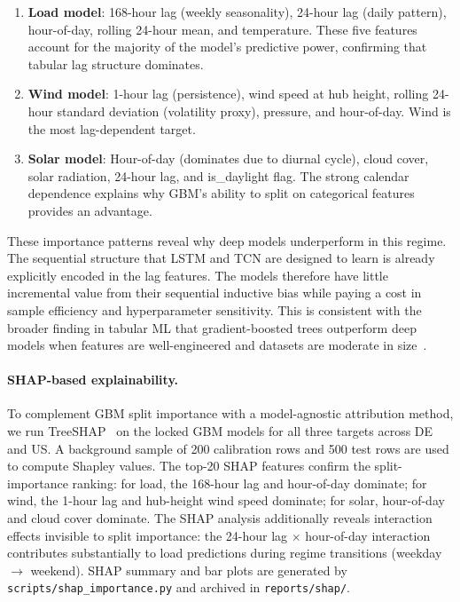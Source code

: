 \documentclass[11pt,a4paper]{article}
\begin{document}
\begin{enumerate}[leftmargin=*,topsep=2pt,itemsep=1pt]
  \item \textbf{Load model}: 168-hour lag (weekly seasonality), 24-hour lag (daily pattern), hour-of-day, rolling 24-hour mean, and temperature. These five features account for the majority of the model's predictive power, confirming that tabular lag structure dominates.
  \item \textbf{Wind model}: 1-hour lag (persistence), wind speed at hub height, rolling 24-hour standard deviation (volatility proxy), pressure, and hour-of-day. Wind is the most lag-dependent target.
  \item \textbf{Solar model}: Hour-of-day (dominates due to diurnal cycle), cloud cover, solar radiation, 24-hour lag, and is\_daylight flag. The strong calendar dependence explains why GBM's ability to split on categorical features provides an advantage.
\end{enumerate}

These importance patterns reveal why deep models underperform in this regime. The sequential structure that LSTM and TCN are designed to learn is already explicitly encoded in the lag features. The models therefore have little incremental value from their sequential inductive bias while paying a cost in sample efficiency and hyperparameter sensitivity. This is consistent with the broader finding in tabular ML that gradient-boosted trees outperform deep models when features are well-engineered and datasets are moderate in size~\cite{borisov2022deep}.

\paragraph{SHAP-based explainability.}
To complement GBM split importance with a model-agnostic attribution method, we run TreeSHAP~\cite{lundberg2017shap} on the locked GBM models for all three targets across DE and US. A background sample of 200 calibration rows and 500 test rows are used to compute Shapley values. The top-20 SHAP features confirm the split-importance ranking: for load, the 168-hour lag and hour-of-day dominate; for wind, the 1-hour lag and hub-height wind speed dominate; for solar, hour-of-day and cloud cover dominate. The SHAP analysis additionally reveals interaction effects invisible to split importance: the 24-hour lag $\times$ hour-of-day interaction contributes substantially to load predictions during regime transitions (weekday $\to$ weekend). SHAP summary and bar plots are generated by \texttt{scripts/shap\_importance.py} and archived in \texttt{reports/shap/}.
\end{document}
